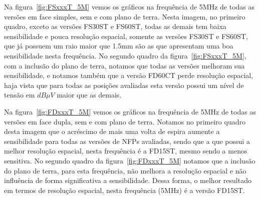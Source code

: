 Na figura~\ref{fig:FSxxxT_5M} vemos os gráficos na frequência de 5MHz de todas as versões em face simples, sem e com plano de terra. Nesta imagem, no primeiro quadro, exceto as versões FS30ST e FS60ST, todas as demais tem baixa sensibilidade e pouca resolução espacial, somente as versões FS30ST e FS60ST, que já possuem um raio maior que 1.5mm são as que apresentam uma boa sensibilidade nesta frequência. No segundo quadro da figura~\ref{fig:FSxxxT_5M}, com a inclusão do plano de terra, notamos que todas as versões melhoram sua sensibilidade, e notamos também que a versão FD60CT perde resolução espacial, haja vista que para todas as posições avaliadas esta versão possui um nível de tensão em $dB \mu V$ maior que as demais. 

Na figura~\ref{fig:FDxxxT_5M} vemos os gráficos na frequência de 5MHz de todas as versões em face dupla, sem e com plano de terra. Notamos no primeiro quadro desta imagem que o acréscimo de mais uma volta de espira aumente a sensibilidade para todas as versões de NFPs avaliadas, sendo que a que possui a melhor resolução espacial, nesta frequência é a FD15ST, mesmo sendo a menos sensitiva. No segundo quadro da figura~\ref{fig:FDxxxT_5M} notamos que a inclusão do plano de terra, para esta frequência, não melhora a resolução espacial e não influência de forma significativa a sensibilidade. Dessa forma, o melhor resultado em termos de resolução espacial, nesta frequência (5MHz) é a versão FD15ST.

